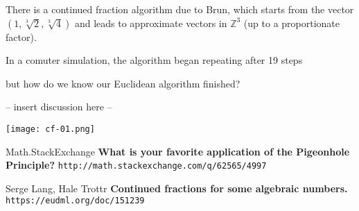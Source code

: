 \documentclass[12pt]{article}
\begin{document}
\noindent There is a continued fraction algorithm due to Brun, which starts from the vector $(1, \sqrt[3]{2}, \sqrt[3]{4})$ and leads to approximate vectors in $\mathbb{Z}^3$ (up to a proportionate factor).  \newline 

\noindent In a comuter simulation, the algorithm began repeating after 19 steps \newpage

\noindent but how do we know our Euclidean algorithm finished? \newline

\noindent -- insert discussion here -- 

\newpage

\texttt{[image: cf-01.png]}

\newpage

\selectfont \fontsize{12}{10}\selectfont

\begin{thebibliography}{}

\item Math.StackExchange \textbf{What is your favorite application of the Pigeonhole Principle?} \texttt{http://math.stackexchange.com/q/62565/4997}

\item Serge Lang, Hale Trottr \textbf{Continued fractions for some algebraic numbers.} \texttt{https://eudml.org/doc/151239}



\end{thebibliography}
\end{document}
